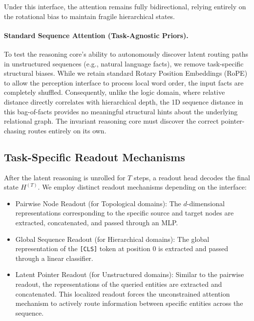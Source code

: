 Under this interface, the attention remains fully bidirectional, relying entirely on the rotational bias to maintain fragile hierarchical states.

\paragraph{Standard Sequence Attention (Task-Agnostic Priors).}

To test the reasoning core's ability to autonomously discover latent routing paths in unstructured sequences (e.g., natural language facts), we remove task-specific structural biases. While we retain standard Rotary Position Embeddings (RoPE) to allow the perception interface to process local word order, the input facts are completely shuffled. Consequently, unlike the logic domain, where relative distance directly correlates with hierarchical depth, the 1D sequence distance in this bag-of-facts provides no meaningful structural hints about the underlying relational graph. The invariant reasoning core must discover the correct pointer-chasing routes entirely on its own.

\subsection{Task-Specific Readout Mechanisms}
\label{sec:readout}

After the latent reasoning is unrolled for $T$ steps, a readout head decodes the final state $H^{(T)}$. We employ distinct readout mechanisms depending on the interface:
\begin{itemize}
    \item Pairwise Node Readout (for Topological domains): The $d$-dimensional representations corresponding to the specific source and target nodes are extracted, concatenated, and passed through an MLP.
    \item Global Sequence Readout (for Hierarchical domains): The global representation of the \texttt{[CLS]} token at position 0 is extracted and passed through a linear classifier.
    \item Latent Pointer Readout (for Unstructured domains): Similar to the pairwise readout, the representations of the queried entities are extracted and concatenated. This localized readout forces the unconstrained attention mechanism to actively route information between specific entities across the sequence.
\end{itemize}
